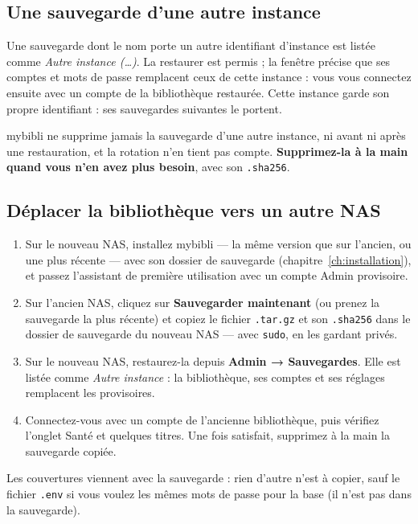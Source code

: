 \subsection*{Une sauvegarde d'une autre instance}

Une sauvegarde dont le nom porte un autre identifiant d'instance est
listée comme \emph{Autre instance (\dots)}. La restaurer est permis ; la
fenêtre précise que ses comptes et mots de passe remplacent ceux de
cette instance : vous vous connectez ensuite avec un compte de la
bibliothèque restaurée. Cette instance garde son propre identifiant :
ses sauvegardes suivantes le portent.

mybibli ne supprime jamais la sauvegarde d'une autre instance, ni avant
ni après une restauration, et la rotation n'en tient pas compte.
\textbf{Supprimez-la à la main quand vous n'en avez plus besoin}, avec
son \texttt{.sha256}.

\subsection*{Déplacer la bibliothèque vers un autre NAS}
\label{sec:backups-move}

\begin{enumerate}
  \item Sur le nouveau NAS, installez mybibli --- la même version que
        sur l'ancien, ou une plus récente --- avec son dossier de
        sauvegarde (chapitre~\ref{ch:installation}), et passez
        l'assistant de première utilisation avec un compte Admin
        provisoire.
  \item Sur l'ancien NAS, cliquez sur \textbf{Sauvegarder maintenant}
        (ou prenez la sauvegarde la plus récente) et copiez le fichier
        \texttt{.tar.gz} et son \texttt{.sha256} dans le dossier de
        sauvegarde du nouveau NAS --- avec \texttt{sudo}, en les gardant
        privés.
  \item Sur le nouveau NAS, restaurez-la depuis \textbf{Admin →
        Sauvegardes}. Elle est listée comme \emph{Autre instance} : la
        bibliothèque, ses comptes et ses réglages remplacent les
        provisoires.
  \item Connectez-vous avec un compte de l'ancienne bibliothèque,
        puis vérifiez l'onglet Santé et quelques titres. Une fois
        satisfait, supprimez à la main la sauvegarde copiée.
\end{enumerate}
Les couvertures viennent avec la sauvegarde : rien d'autre n'est à
copier, sauf le fichier \texttt{.env} si vous voulez les mêmes mots de
passe pour la base (il n'est pas dans la sauvegarde).

